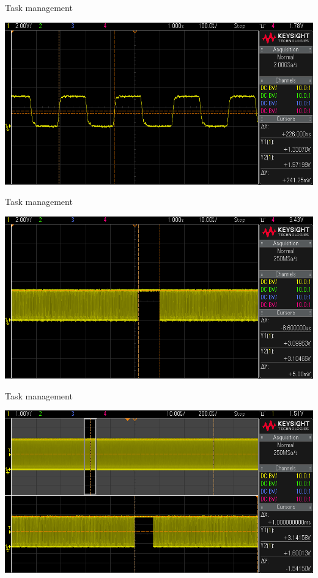 \documentclass[
aspectratio=169,
]{beamer}
\begin{document}
\begin{frame}{Task management}
	\begin{center}
		\includegraphics[width=.9\textwidth]{img/scope_4a.png}
	\end{center}
\end{frame}

\begin{frame}{Task management}
	\begin{center}
		\includegraphics[width=.9\textwidth]{img/scope_4b.png}
	\end{center}
\end{frame}

\begin{frame}{Task management}
	\begin{center}
		\includegraphics[width=.9\textwidth]{img/scope_4c.png}
	\end{center}
\end{frame}
\end{document}
